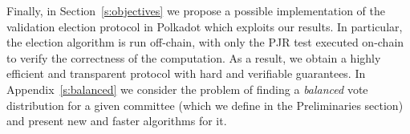 Finally, in Section~\ref{s:objectives} we propose a possible implementation of the validation election protocol in Polkadot which exploits our results. In particular, the election algorithm is run off-chain, with only the PJR test executed on-chain to verify the correctness of the computation. 
 As a result, we obtain a highly efficient and transparent protocol with hard and verifiable guarantees. 
In Appendix~\ref{s:balanced} we consider the problem of finding a \emph{balanced} vote distribution for a given committee (which we define in the Preliminaries section) and present new and faster algorithms for it.
